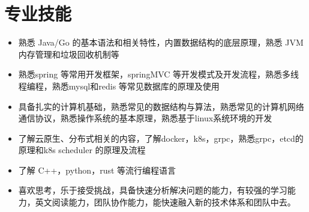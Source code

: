\documentclass[letterpaper,11pt]{ctexart}
\makeatletter
\newcommand{\resumeItem}[1]{
  \item\small{
    {#1 \vspace{-2pt}}
  }
}
\newcommand{\resumeSubheading}[4]{
  \vspace{-2pt}\item
    \begin{tabular*}{1.0\textwidth}[t]{l@{\extracolsep{\fill}}r}
      \textbf{#1} & \textbf{\small #2} \\
      \textit{\small#3} & \textit{\small #4} \\
    \end{tabular*}\vspace{-7pt}
}
\newcommand{\resumeSubHeadingListStart}{\begin{itemize}[leftmargin=0.0in, label={}]}
\newcommand{\resumeSubHeadingListEnd}{\end{itemize}}
\newcommand{\resumeItemListStart}{\begin{itemize}}
\newcommand{\resumeItemListEnd}{\end{itemize}\vspace{-5pt}}
\makeatother
\begin{document}
%
\section{专业技能}
    \resumeItemListStart
    \resumeItem{熟悉 Java/Go 的基本语法和相关特性，内置数据结构的底层原理，熟悉 JVM 内存管理和垃圾回收机制等}
    \resumeItem{熟悉spring 等常用开发框架，springMVC 等开发模式及开发流程，熟悉多线程编程，熟悉mysql和redis 等常见数据库的原理及使用}
    \resumeItem{具备扎实的计算机基础，熟悉常见的数据结构与算法，熟悉常见的计算机网络通信协议，熟悉操作系统的基本原理，熟悉基于linux系统环境的开发}
    \resumeItem{了解云原生、分布式相关的内容，了解docker，k8s，grpc，熟悉grpc，etcd的原理和k8s scheduler 的原理及流程}
    \resumeItem{了解 C++，python，rust 等流行编程语言}
    \resumeItem{喜欢思考，乐于接受挑战，具备快速分析解决问题的能力，有较强的学习能力，英文阅读能力，团队协作能力，能快速融入新的技术体系和团队中去。}
    \resumeItemListEnd
 \vspace{-16pt}


%
\end{document}
